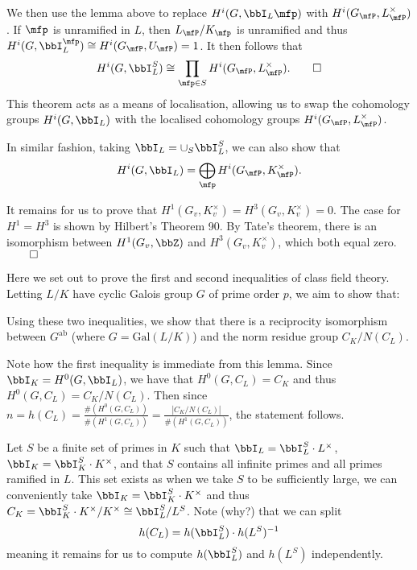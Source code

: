 \documentclass[a4paper, 12pt,oneside,openany]{book}
\begin{document}
We then use the lemma above to replace $H^i(G, \bbI_L\mfp)$ with $H^i(G_\mfP, L_\mfP^\times)$. If $\mfp$ is unramified in $L$, then $L_\mfP/K_\mfp$ is unramified and thus $H^i(G, \bbI_L^\mfp) \cong H^i(G_\mfP, U_\mfP) = 1$. It then follows that $$H^i(G, \bbI_L^S) \cong \prod\limits_{\mfp \in S}H^i(G_\mfP, L_\mfP^\times). \qed$$ This theorem acts as a means of localisation, allowing us to swap the cohomology groups $H^i(G, \bbI_L)$ with the localised cohomology groups $H^i(G_\mfP, L_\mfP^\times)$.

In similar fashion, taking $\bbI_L = \cup_S \bbI_L^S$, we can also show that $$H^i(G, \bbI_L)= \bigoplus\limits_{\mfp} H^i(G_\mfP, K_\mfP^\times).$$


 It remains for us to prove that $H^1(G_v, K_v^\times) = H^3(G_v, K_v^\times)=0$. The case for $H^1=H^3$ is shown by Hilbert's Theorem 90. By Tate's theorem, there is an isomorphism between $H^1(G_v, \bbZ)$ and $H^3(G_v, K_v^\times)$, which both equal zero. $\qed$

Here we set out to prove the first and second inequalities of class field theory. Letting $L/K$ have cyclic Galois group $G$ of prime order $p$, we aim to show that:



Using these two inequalities, we show that there is a reciprocity isomorphism between $G^{\text{ab}}$ (where $G=\text{Gal}(L/K)$) and the norm residue group $C_K/N(C_L)$.


Note how the first inequality is immediate from this lemma. Since $\bbI_K=H^0(G, \bbI_L)$, we have that $H^0(G, C_L)=C_K$ and thus $H^0(G, C_L) = C_K / N(C_L)$. Then since $n=h(C_L) = \frac{\#(H^0(G, C_L))}{\#(H^1(G, C_L))}=\frac{|C_K / N(C_L)|}{\#(H^1(G, C_L))}$, the statement follows.

 Let $S$ be a finite set of primes in $K$ such that $\bbI_L = \bbI_L^S \cdot L^\times$, $\bbI_K = \bbI_K^S \cdot K^\times$, and that $S$ contains all infinite primes and all primes ramified in $L$. This set exists as when we take $S$ to be sufficiently large, we can conveniently take $\bbI_K = \bbI_K^S \cdot K^\times$ and thus $C_K = \bbI_K^S \cdot K^\times / K^\times \cong \bbI_L^S / L^S$. Note (why?) that we can split $$h(C_L) = h(\bbI_L^S) \cdot h(L^S)^{-1}$$ meaning it remains for us to compute $h(\bbI_L^S)$ and $h(L^S)$ independently. 
\end{document}
